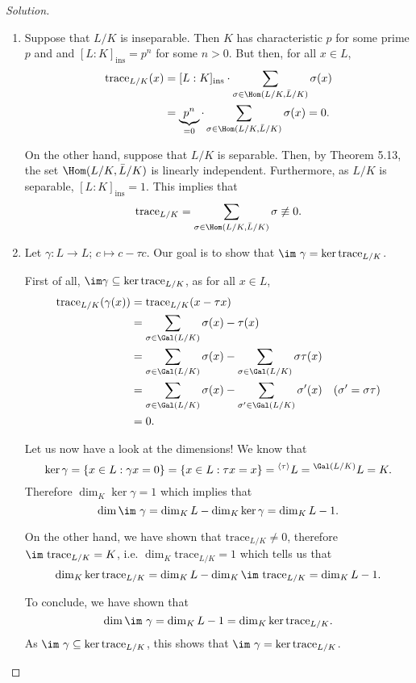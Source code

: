 \documentclass[a4paper,10pt,reqno]{amsart}
\newenvironment{sol}
  {\renewcommand\qedsymbol{$\blacksquare$}\begin{proof}[Solution]}
  {\end{proof}}
\begin{document}
\begin{sol}
    \begin{enumerate}[label=(\roman*)]
        \item Suppose that $L/K$ is inseparable. Then $K$ has characteristic $p$ for some prime $p$ and and $[L:K]_{\mathrm{ins}} = p^n$ for some $n > 0$. But then, for all $x \in L$,
        \begin{align*}
            \mathrm{trace}_{L/K}(x) & = [L:K]_{\mathrm{ins}} \cdot \sum_{\sigma \in \Hom(L/K,\Bar{L}/K)} \sigma(x) \\
            & = \underbrace{p^n}_{=0} \cdot \sum_{\sigma \in \Hom(L/K,\Bar{L}/K)} \sigma(x) = 0.
        \end{align*}

        On the other hand, suppose that $L/K$ is separable. Then, by Theorem 5.13, the set $\Hom(L/K,\Bar{L}/K)$ is linearly independent. Furthermore, as $L/K$ is separable, $[L:K]_{\mathrm{ins}} = 1$. This implies that
        \[
        \mathrm{trace}_{L/K} = \sum_{\sigma \in \Hom(L/K,\Bar{L}/K)} \sigma \not \equiv 0.
        \]

        \item Let $\gamma: L \to L$; $c \mapsto c - \tau c$. Our goal is to show that $\im\ \gamma = \ker \mathrm{trace}_{L/K}$.

        First of all, $\im \gamma \subseteq  \ker \mathrm{trace}_{L/K}$, as for all $x \in L$,
        \begin{align*}
        \mathrm{trace}_{L/K}(\gamma(x)) & = \mathrm{trace}_{L/K}(x - \tau x) \\
        & = \sum_{\sigma \in \Gal(L/K)} \sigma(x) - \tau(x) \\
        & =  \sum_{\sigma \in \Gal(L/K)} \sigma(x) - \sum_{\sigma \in \Gal(L/K)} \sigma \tau(x) \\
        & = \sum_{\sigma \in \Gal(L/K)} \sigma(x) - \sum_{\sigma^{\prime} \in \Gal(L/K)} \sigma^{\prime}(x) \quad (\sigma^{\prime} = \sigma \tau ) \\
        & = 0.
        \end{align*}

        Let us now have a look at the dimensions! We know that
        \[
        \ker \gamma = \{ x \in L: \gamma x = 0 \} = \{ x \in L : \tau x = x \} = {}^{\left\langle \tau \right\rangle} L = {}^{\Gal(L/K)}L = K. 
        \]
        Therefore $\dim_K \ker \gamma = 1$ which implies that
        \[
        \dim \im\ \gamma = \dim_KL - \dim_K \ker \gamma = \dim_KL - 1.
        \]

        On the other hand, we have shown that $\mathrm{trace}_{L/K} \neq 0$, therefore $\im\  \mathrm{trace}_{L/K} = K$, i.e. $\dim_K \mathrm{trace}_{L/K} = 1$ which tells us that
        \[
        \dim_K \ker \mathrm{trace}_{L/K} = \dim_KL - \dim_K \im \ \mathrm{trace}_{L/K} = \dim_KL - 1.
        \]

        To conclude, we have shown that
        \[
        \dim \im\ \gamma  = \dim_KL - 1 = \dim_K \ker \mathrm{trace}_{L/K}.
        \]
        As $\im\ \gamma \subseteq \ker \mathrm{trace}_{L/K}$, this shows that $\im\ \gamma = \ker \mathrm{trace}_{L/K}$.\qedhere
    \end{enumerate}
\end{sol}
\end{document}
